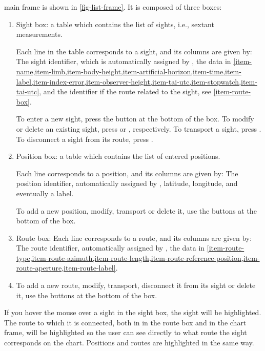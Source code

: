 \documentclass{ol-softwaremanual}
\begin{document}
\thel main frame is shown in \cref{fig-list-frame}. It is composed of three boxes: 
\begin{enumerate}
  \item \label{item-sight-box} Sight box: a table which contains the list of sights, i.e., sextant measurements. 
  
  Each line in the table corresponds to a sight, and its columns are given by: The sight identifier, which is automatically assigned by \thel,  the data in \cref{item-name,item-limb,item-body-height,item-artificial-horizon,item-time,item-label,item-index-error,item-observer-height,item-tai-utc,item-stopwatch,item-tai-utc}, and the identifier if the route related to the sight, see \cref{item-route-box}. 

  To enter a new sight, press the  button at the bottom of the box. To modify or delete an existing sight, press   or  , respectively. To transport a sight, press . 
   To disconnect a sight from its route, press  . 

  \item \label{item-position-box} Position box: a table which contains the list of entered positions. 
  
  Each line corresponds to a position, and its columns are given by: The position identifier, automatically assigned by \thel,  latitude, longitude, and eventually a label. 

To add a new position, modify, transport or delete it, use the buttons at the bottom of the box. 

  \item \label{item-route-box} Route box: Each line corresponds to a route, and its columns are given by: The route identifier, automatically assigned by \thel, the data in \cref{item-route-type,item-route-azimuth,item-route-length,item-route-reference-position,item-route-aperture,item-route-label}. 
  \item 
  To add a new route, modify, transport, disconnect it from its sight or delete it, use the buttons at the bottom of the box. 

\end{enumerate}



If you hover the mouse over a sight in the sight box, the sight will be highlighted. The route to which it is connected, both in in the route box and in the chart frame, will be highlighted so the user can see directly to what route the sight corresponds on the chart. Positions and routes are highlighted in the same way. 
\end{document}

